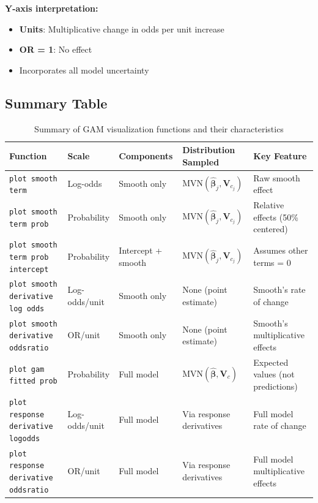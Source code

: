 \documentclass[11pt, a4paper]{article}
\begin{document}
\textbf{Y-axis interpretation:}
\begin{itemize}
   \item \textbf{Units}: Multiplicative change in odds per unit increase
   \item \textbf{OR = 1}: No effect
   \item Incorporates all model uncertainty
\end{itemize}

\subsection{Summary Table}
\begin{table}[htbp]
\centering
\caption{Summary of GAM visualization functions and their characteristics}
\label{tab:gam_functions}
\small
\begin{tabularx}{\linewidth}{>{\RaggedRight}p{3.5cm} >{\RaggedRight}X >{\RaggedRight}X >{\RaggedRight}X >{\RaggedRight}X}
\toprule
\textbf{Function} & \textbf{Scale} & \textbf{Components} & \textbf{Distribution Sampled} & \textbf{Key Feature} \\
\midrule
\texttt{plot smooth term} & Log-odds & Smooth only & $\text{MVN}(\hat{\boldsymbol{\beta}}_j, \mathbf{V}_{c_j})$ & Raw smooth effect \\
\texttt{plot smooth term prob} & Probability & Smooth only & $\text{MVN}(\hat{\boldsymbol{\beta}}_j, \mathbf{V}_{c_j})$ & Relative effects (50\% centered) \\
\texttt{plot smooth term prob intercept} & Probability & Intercept + smooth & $\text{MVN}(\hat{\boldsymbol{\beta}}_j, \mathbf{V}_{c_j})$ & Assumes other terms = 0 \\
\texttt{plot smooth derivative log odds} & Log-odds/unit & Smooth only & None (point estimate) & Smooth's rate of change \\
\texttt{plot smooth derivative oddsratio} & OR/unit & Smooth only & None (point estimate) & Smooth's multiplicative effects \\
\texttt{plot gam fitted prob} & Probability & Full model & $\text{MVN}(\hat{\boldsymbol{\beta}}, \mathbf{V}_c)$ & Expected values (not predictions) \\
\texttt{plot response derivative logodds} & Log-odds/unit & Full model & Via response derivatives & Full model rate of change \\
\texttt{plot response derivative oddsratio} & OR/unit & Full model & Via response derivatives & Full model multiplicative effects \\
\bottomrule
\end{tabularx}
\end{table}
\end{document}
